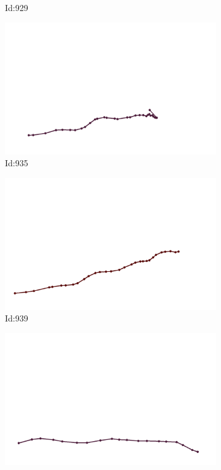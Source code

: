 \documentclass[12pt,twoside]{report}
\begin{document}
\begin{figure}
\begin{subfigure}[b]{0.20\textwidth}
\caption{Id:929}
\end{subfigure}
\begin{subfigure}[b]{0.20\textwidth}
\centering
\includegraphics[width=\textwidth]{../trajectories/935.png}
\caption{Id:935}
\end{subfigure}
\begin{subfigure}[b]{0.20\textwidth}
\centering
\includegraphics[width=\textwidth]{../trajectories/939.png}
\caption{Id:939}
\end{subfigure}
\begin{subfigure}[b]{0.20\textwidth}
\centering
\includegraphics[width=\textwidth]{../trajectories/942.png}

\end{subfigure}
\end{figure}
\end{document}

